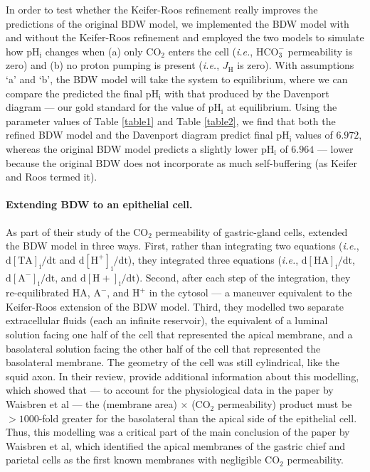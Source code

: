 \documentclass[fleqn,10pt]{physiome}
\begin{document}
In order to test whether the Keifer-Roos refinement really improves the predictions of the original BDW model, we implemented the BDW model with and without the Keifer-Roos refinement and employed the two models to simulate how $\mathrm{pH_i}$  changes when (a) only $\mathrm{CO_2}$ enters the cell (\emph{i.e.}, $\mathrm{HCO_3^-}$ permeability is zero) and (b) no proton pumping is present (\emph{i.e.}, $J_\mathrm{H}$ is zero). With assumptions `a' and `b', the BDW model will take the system to equilibrium, where we can compare the predicted the final $\mathrm{pH_i}$  with that produced by the Davenport diagram --- our gold standard for the value of $\mathrm{pH_i}$ at equilibrium. Using the parameter values of Table \ref{table1} and Table \ref{table2}, we find that both the refined BDW model and the Davenport diagram predict final $\mathrm{pH_i}$ values of $6.972$, whereas the original BDW model predicts a slightly lower $\mathrm{pH_i}$ of $6.964$ --- lower because the original BDW does not incorporate as much self-buffering (as Keifer and Roos termed it).\\

\paragraph{Extending BDW to an epithelial cell.} As part of their study of the $\mathrm{CO_2}$ permeability of gastric-gland cells, \cite{waisbren1994unusual} extended the BDW model in three ways. First, rather than integrating two equations (\emph{i.e.}, $\mathrm{d[TA]_i/dt}$ and $\mathrm{d[H^+]_i/dt}$), they integrated three equations (\emph{i.e.}, $\mathrm{d[HA]_i/dt}$, $\mathrm{d[A^-]_i/dt}$, and $\mathrm{d[H+]_i/dt}$). Second, after each step of the integration, they re-equilibrated $\mathrm{HA}$, $\mathrm{A^-}$, and $\mathrm{H^+}$ in the cytosol --- a maneuver equivalent to the Keifer-Roos extension of the BDW model. Third, they modelled two separate extracellular fluids (each an infinite reservoir), the equivalent of a luminal solution facing one half of the cell that represented the apical membrane, and a basolateral solution facing the other half of the cell that represented the basolateral membrane. The geometry of the cell was still cylindrical, like the squid axon. In their review, \cite{boron1994unique} provide additional information about this modelling, which showed that --- to account for the physiological data in the paper by Waisbren et al --- the (membrane area) $\times$ ($\mathrm{CO_2}$ permeability) product must be $>1000$-fold greater for the basolateral than the apical side of the epithelial cell. Thus, this modelling was a critical part of the main conclusion of the paper by Waisbren et al, which identified the apical membranes of the gastric chief and parietal cells as the first known membranes with negligible $\mathrm{CO_2}$ permeability.\\
\end{document}
